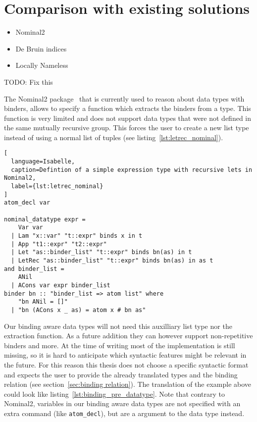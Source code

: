 \chapter{Comparison with existing solutions}\label{chapter:comparison}

\begin{itemize}
\item{Nominal2}
\item{De Bruin indices}
\item{Locally Nameless}
\end{itemize}


TODO: Fix this

The Nominal2 package~\cite{nominal2} that is currently used to reason about data types with binders, allows to specify a function which extracts the binders from a type. This function is very limited and does not support data types that were not defined in the same mutually recursive group. This forces the user to create a new list type instead of using a normal list of tuples (see listing~\ref{lst:letrec_nominal}).

\begin{lstlisting}[
  language=Isabelle,
  caption=Defintion of a simple expression type with recursive lets in Nominal2,
  label={lst:letrec_nominal}
]
atom_decl var

nominal_datatype expr =
    Var var
  | Lam "x::var" "t::expr" binds x in t
  | App "t1::expr" "t2::expr"
  | Let "as::binder_list" "t::expr" binds bn(as) in t
  | LetRec "as::binder_list" "t::expr" binds bn(as) in as t
and binder_list =
    ANil
  | ACons var expr binder_list
binder bn :: "binder_list => atom list" where
    "bn ANil = []"
  | "bn (ACons x _ as) = atom x # bn as"
\end{lstlisting}

Our binding aware data types will not need this auxilliary list type nor the extraction function. As a future addition they can however support non-repetitive binders and more. At the time of writing most of the implementation is still missing, so it is hard to anticipate which syntactic features might be relevant in the future. For this reason this thesis does not choose a specific syntactic format and expects the user to provide the already translated types and the binding relation (see section~\ref{sec:binding relation}). The translation of the example above could look like listing~\ref{lst:binding_pre_datatype}. Note that contrary to Nominal2, variables in our binding aware data types are not specified with an extra command (like \texttt{atom\_decl}), but are a argument to the data type instead.

